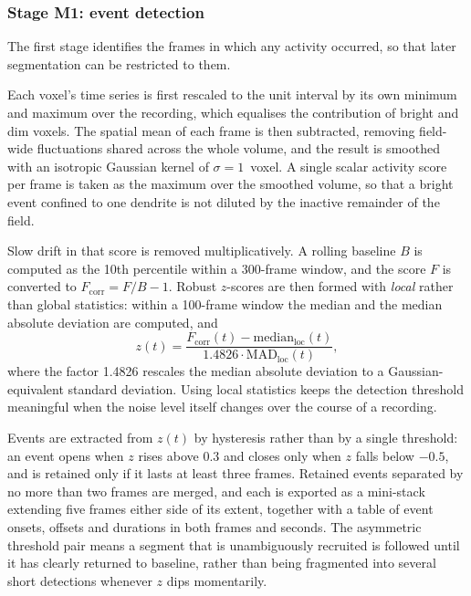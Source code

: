 		\subsubsection{Stage M1: event detection}

			The first stage identifies the frames in which any activity occurred,
			so that later segmentation can be restricted to them.

			Each voxel's time series is first rescaled to the unit interval by
			its own minimum and maximum over the recording, which equalises the
			contribution of bright and dim voxels.
			The spatial mean of each frame is then subtracted, removing
			field-wide fluctuations shared across the whole volume, and the
			result is smoothed with an isotropic Gaussian kernel of
			$\sigma = 1$~voxel.
			A single scalar activity score per frame is taken as the maximum over
			the smoothed volume, so that a bright event confined to one dendrite
			is not diluted by the inactive remainder of the field.

			Slow drift in that score is removed multiplicatively.
			A rolling baseline $B$ is computed as the 10th percentile within a
			300-frame window, and the score $F$ is converted to
			$F_\mathrm{corr} = F/B - 1$.
			Robust $z$-scores are then formed with \emph{local} rather than
			global statistics: within a 100-frame window the median and the
			median absolute deviation are computed, and
			\begin{equation}\label{equation:methods:m1z}
				z(t) = \frac{F_\mathrm{corr}(t) - \mathrm{median}_\mathrm{loc}(t)}
				            {1.4826 \cdot \mathrm{MAD}_\mathrm{loc}(t)},
			\end{equation}
			where the factor 1.4826 rescales the median absolute deviation to a
			Gaussian-equivalent standard deviation.
			Using local statistics keeps the detection threshold meaningful when
			the noise level itself changes over the course of a recording.

			Events are extracted from $z(t)$ by hysteresis rather than by a
			single threshold: an event opens when $z$ rises above $0.3$ and
			closes only when $z$ falls below $-0.5$, and is retained only if it
			lasts at least three frames.
			Retained events separated by no more than two frames are merged, and
			each is exported as a mini-stack extending five frames either side of
			its extent, together with a table of event onsets, offsets and
			durations in both frames and seconds.
			The asymmetric threshold pair means a segment that is unambiguously
			recruited is followed until it has clearly returned to baseline,
			rather than being fragmented into several short detections whenever
			$z$ dips momentarily.

